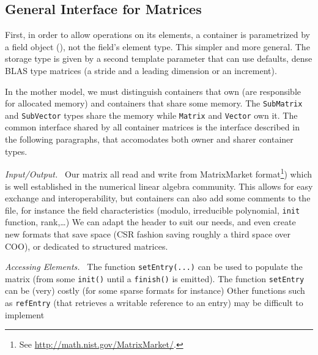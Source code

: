 \subsection{General Interface for %
Matrices}
%
First, in order to allow operations on its elements, a container is
parametrized by a field object (\cf {}), not the field's element
type. This simpler and more general.  The storage type is given by a second
template parameter that can use defaults,
\eg dense BLAS type matrices (a stride
and a leading dimension or an increment).
%

%
In the mother model, we must distinguish containers that own (are responsible
for allocated memory) and containers that share some memory.  The
\texttt{SubMatrix} and \texttt{SubVector} types share the memory while
\texttt{Matrix} and \texttt{Vector} own it.
%
The common interface shared by all container matrices is the \applin  interface
described in the following paragraphs, that accomodates both owner and sharer
container types.
%
% 
%
%
\def\monitem#1{\par\textit{#1}\ }
\monitem{Input/Output.}
		Our matrix all read and write from MatrixMarket
		format\footnote{See \url{http://math.nist.gov/MatrixMarket/}.})
		which is well established in the numerical linear algebra
		community.  This allows for easy exchange and
		interoperability, but \linbox containers can also add some
		comments to the file, for instance the field characteristics
		(modulo, irreducible polynomial, {\tt init} function,
		rank,\ldots) We can adapt the header to suit our needs, and
		even create new formats that save space (CSR fashion saving
		roughly a third space over COO), or dedicated to structured
		matrices.
%
		\monitem{Accessing Elements.}
		The function \texttt{setEntry(...)} can be
		used to populate the matrix (from some \texttt{init()} until a
		\texttt{finish()} is emitted).  The function \texttt{setEntry}
		can be (very) costly (for some sparse formats for instance)
%
		Other functions such as {\tt refEntry} (that retrieves a
		writable reference to an entry) may be difficult to implement
